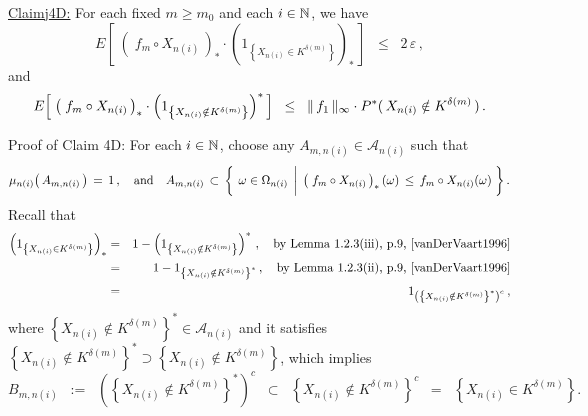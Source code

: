 \vskip 0.8cm
\begin{center}\begin{minipage}{6.5in}
\underline{Claim{{\color{white}j}}4D:}\;\;
For each fixed $m \geq m_{0}$ and each $i \in \mathbb{N}$, we have
\begin{equation*}
E\!\left[\;
	\left(\;f_{m} \circ X_{n(i)}\,\right)_{*}
	\cdot
	\left(1_{\left\{X_{n(i)} \in K^{\delta(m)}\right\}}\right)_{*}
\,\right]
\;\;\leq\;\; 2\,\varepsilon\,,
\end{equation*}
and
\begin{equation*}
E\!\left[\;
	\left(\;f_{m} \circ X_{n(i)}\,\right)_{*}
	\cdot
	\left(1_{\left\{X_{n(i)} \notin K^{\delta(m)}\right\}}\right)^{*}
\,\right]
\;\;\leq\;\; \Vert\,f_{1}\,\Vert_{\infty} \cdot P^{*}(\,X_{n(i)} \overset{{\color{white}.}}{\notin} K^{\delta(m)}\,)\,.
\end{equation*}
\end{minipage}\end{center}
Proof of Claim 4D:\;\;
For each $i \in \mathbb{N}$, choose any $A_{m,n(i)} \in \mathcal{A}_{n(i)}$ such that
\begin{equation*}
\mu_{n(i)}\!\left(\,A_{m,n(i)}\,\right) \,=\, 1\,,
\quad\textnormal{and}\quad
A_{m,n(i)} \,\subset\,
\left\{\;
	\left.
	\omega \overset{{\color{white}-}}{\in} \Omega_{n(i)}
	\;\,\right\vert\;
	\left(\;f_{m} \circ X_{n(i)}\,\right)_{*}(\omega) \,\leq\, f_{m} \circ X_{n(i)}(\omega)
\;\right\}.
\end{equation*}
Recall that
\begin{eqnarray*}
\left(1_{\left\{X_{n(i)} \in K^{\delta(m)}\right\}}\right)_{*}
& = &
	1 - \left(1_{\left\{X_{n(i)} \notin K^{\delta(m)}\right\}}\right)^{*}\,,
	\quad
	\textnormal{by Lemma 1.2.3(iii), p.9, \cite{vanDerVaart1996}}
\\
& = &
	1 - 1_{\left\{X_{n(i)} \notin K^{\delta(m)}\right\}^{*}}\,,
	\quad
	\textnormal{by Lemma 1.2.3(ii), p.9, \cite{vanDerVaart1996}}
\\
& = &
	1_{\left(\left\{X_{n(i)} \notin K^{\delta(m)}\right\}^{*}\right)^{c}}\,,
\end{eqnarray*}
where $\left\{X_{n(i)} \notin K^{\delta(m)}\right\}^{*} \in \mathcal{A}_{n(i)}$
and it satisfies 
$\left\{X_{n(i)} \notin K^{\delta(m)}\right\}^{*} \supset \left\{X_{n(i)} \notin K^{\delta(m)}\right\}$,
which implies
\begin{equation*}
B_{m,n(i)}
\;\; :=	 \;\;
	\left(\left\{X_{n(i)} \notin K^{\delta(m)}\right\}^{*}\right)^{c}
\;\; \subset \;\;
	\left\{X_{n(i)} \notin K^{\delta(m)}\right\}^{c}
\;\; = \;\;
	\left\{X_{n(i)} \in K^{\delta(m)}\right\}.
\end{equation*}
